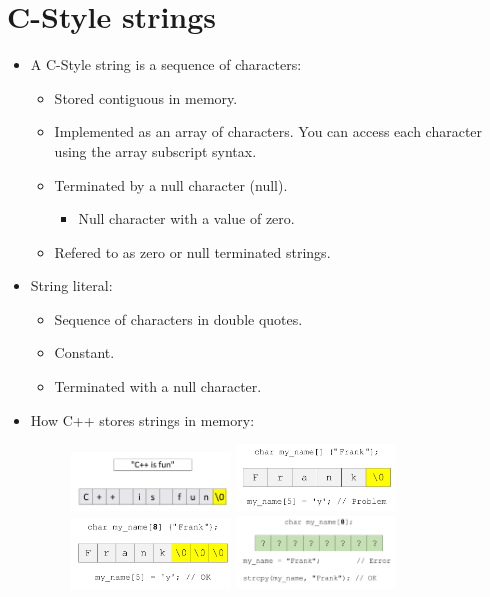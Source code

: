 \section{C-Style strings}
\begin{itemize}
    \item A C-Style string is a sequence of characters:
        \begin{itemize}
            \item Stored contiguous in memory.
            \item Implemented as an array of characters. You can access each character using the array subscript syntax.
            \item Terminated by a null character (null).
                \begin{itemize}
                    \item Null character with a value of zero.
                \end{itemize}
            \item Refered to as zero or null terminated strings.
        \end{itemize}
    
    \item String literal:
        \begin{itemize}
            \item Sequence of characters in double quotes.
            \item Constant.
            \item Terminated with a null character.
        \end{itemize}
    
    \item How C++ stores strings in memory:
        \begin{figure}[H]
            \centering
            \includegraphics[width=0.4\textwidth]{./figs/stringmem}
            \includegraphics[width=0.4\textwidth]{./figs/stringmem1}
            \includegraphics[width=0.4\textwidth]{./figs/stringmem2}
            \includegraphics[width=0.4\textwidth]{./figs/stringmem3}
        \end{figure}
    

\end{itemize}
